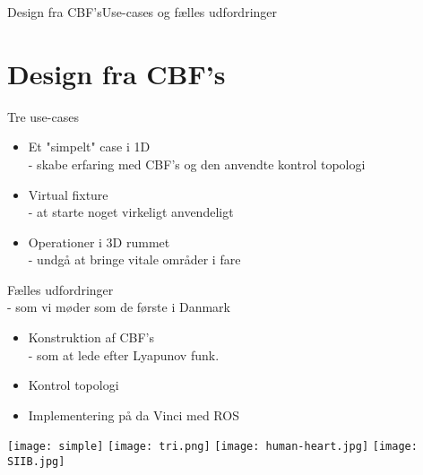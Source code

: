 \begin{frame}{Design fra CBF's}{Use-cases og fælles udfordringer}
\section{Design fra CBF's}
\begin{minipage}{0.5\textwidth}
	\begin{block}{Tre use-cases}
		\begin{itemize}
			\item Et "simpelt" case i 1D \\ \scriptsize{ - skabe erfaring med CBF's og den anvendte kontrol topologi}
			\item  \normalsize Virtual fixture \\ \scriptsize - at starte noget virkeligt anvendeligt
			\item \normalsize  Operationer i 3D rummet \\  \scriptsize - undgå at bringe vitale områder i fare
		\end{itemize}
	\end{block}
	\begin{block}{Fælles udfordringer\\ \scriptsize {\color{white}{lol}} - som vi møder som de første i Danmark}
		\begin{itemize}
			\item Konstruktion af CBF's \\ \scriptsize - som at lede efter Lyapunov funk.
			\item \normalsize Kontrol topologi
			\item Implementering på da Vinci med ROS
		\end{itemize}
	\end{block}
\end{minipage}
\hspace{0.3cm}
\begin{minipage}{0.45\textwidth}
\texttt{[image: simple]}
\texttt{[image: tri.png]}
\vspace{0.2cm}
\texttt{[image: human-heart.jpg]}
\vspace{0.2cm}
\texttt{[image: SIIB.jpg]}
\vspace{0.2cm}
\end{minipage}
\end{frame}

